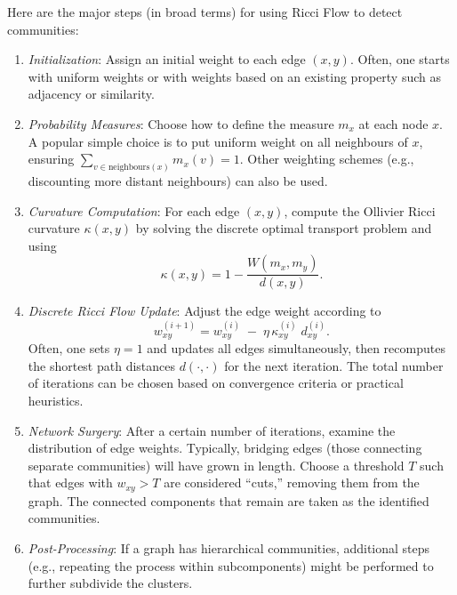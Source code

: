 Here are the major steps (in broad terms) for using Ricci Flow to detect communities:
\begin{enumerate}
    \item \emph{Initialization}: Assign an initial weight to each edge $(x,y)$. Often, one starts with uniform weights or with weights based on an existing property such as adjacency or similarity.
    \item \emph{Probability Measures}: Choose how to define the measure $m_x$ at each node $x$. A popular simple choice is to put uniform weight on all neighbours of $x$, ensuring $\sum_{v \in \text{neighbours}(x)} m_x(v)=1$. Other weighting schemes (e.g., discounting more distant neighbours) can also be used.
    \item \emph{Curvature Computation}: For each edge $(x,y)$, compute the Ollivier Ricci curvature $\kappa(x,y)$ by solving the discrete optimal transport problem and using 
    \begin{equation}
    \kappa(x,y) = 1 - \frac{W(m_x, m_y)}{d(x,y)}.
    \end{equation}
    \item \emph{Discrete Ricci Flow Update}: Adjust the edge weight according to
    \begin{equation}
    w_{xy}^{(i+1)} = w_{xy}^{(i)} \;-\; \eta \,\kappa_{xy}^{(i)} \; d_{xy}^{(i)}.
    \end{equation}
    Often, one sets $\eta=1$ and updates all edges simultaneously, then recomputes the shortest path distances $d(\cdot,\cdot)$ for the next iteration. The total number of iterations can be chosen based on convergence criteria or practical heuristics.
    \item \emph{Network Surgery}: After a certain number of iterations, examine the distribution of edge weights. Typically, bridging edges (those connecting separate communities) will have grown in length. Choose a threshold $T$ such that edges with $w_{xy} > T$ are considered “cuts,” removing them from the graph. The connected components that remain are taken as the identified communities.
    \item \emph{Post-Processing}: If a graph has hierarchical communities, additional steps (e.g., repeating the process within subcomponents) might be performed to further subdivide the clusters.
\end{enumerate}

